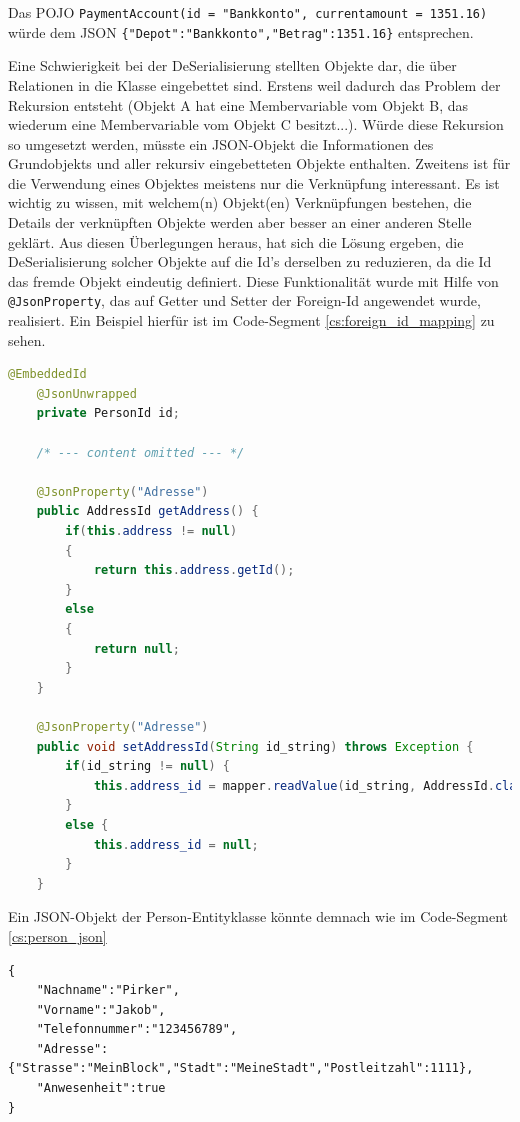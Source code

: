 Das POJO \verb|PaymentAccount(id = "Bankkonto", currentamount = 1351.16)| würde \newline dem JSON \verb|{"Depot":"Bankkonto","Betrag":1351.16}| entsprechen.


Eine Schwierigkeit bei der DeSerialisierung stellten Objekte dar, die über Relationen in die Klasse eingebettet sind. Erstens weil dadurch das Problem der Rekursion entsteht (Objekt A hat eine Membervariable vom Objekt B, das wiederum eine Membervariable vom Objekt C besitzt...). Würde diese Rekursion so umgesetzt werden, müsste ein JSON-Objekt die Informationen des Grundobjekts und aller rekursiv eingebetteten Objekte enthalten. Zweitens ist für die Verwendung eines Objektes meistens nur die Verknüpfung interessant. Es ist wichtig zu wissen, mit welchem(n) Objekt(en) Verknüpfungen bestehen, die Details der verknüpften Objekte werden aber besser an einer anderen Stelle geklärt. Aus diesen Überlegungen heraus, hat sich die Lösung ergeben, die DeSerialisierung solcher Objekte auf die Id's derselben zu reduzieren, da die Id das fremde Objekt eindeutig definiert. Diese Funktionalität wurde mit Hilfe von \verb|@JsonProperty|, das auf Getter und Setter der Foreign-Id angewendet wurde, realisiert. Ein Beispiel hierfür ist im Code-Segment \ref{cs:foreign_id_mapping} zu sehen.

\scriptsize
\begin{lstlisting}[caption=Foreign-Id mapping für die Address-Entity in Person.java, label=cs:foreign_id_mapping, language=Java]
	@EmbeddedId
	@JsonUnwrapped
	private PersonId id;
	
	/* --- content omitted --- */
	
	@JsonProperty("Adresse")
	public AddressId getAddress() {
	   	if(this.address != null)
	   	{
	   		return this.address.getId();
	   	}
	   	else
	   	{
	   		return null;
	   	}
	}
	
	@JsonProperty("Adresse")
	public void setAddressId(String id_string) throws Exception {
	   	if(id_string != null) {
	   		this.address_id = mapper.readValue(id_string, AddressId.class);
	   	}
	   	else {
	   		this.address_id = null;
	   	}
	}
\end{lstlisting}
\normalsize

Ein JSON-Objekt der Person-Entityklasse könnte demnach wie im Code-Segment \ref{cs:person_json}

\scriptsize
\begin{lstlisting}[label = cs:person_json, caption = Beispiel für ein Serialisiertes JSON-Objekt]
{	
	"Nachname":"Pirker",
	"Vorname":"Jakob",
	"Telefonnummer":"123456789",
	"Adresse":{"Strasse":"MeinBlock","Stadt":"MeineStadt","Postleitzahl":1111},
	"Anwesenheit":true
}
\end{lstlisting}
\normalsize

